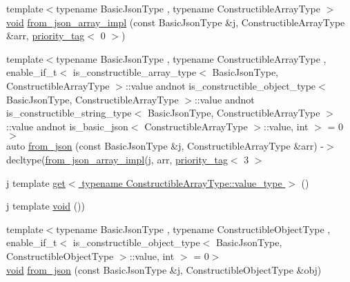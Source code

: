 \begin{DoxyCompactItemize}
{\footnotesize template$<$typename Basic\+Json\+Type , typename Constructible\+Array\+Type $>$ }\\\hyperlink{namespacenlohmann_1_1detail_a59fca69799f6b9e366710cb9043aa77d}{void} \hyperlink{namespacenlohmann_1_1detail_a20cf21255e75cff1ffb0869c2c545e63}{from\+\_\+json\+\_\+array\+\_\+impl} (const Basic\+Json\+Type \&j, Constructible\+Array\+Type \&arr, \hyperlink{structnlohmann_1_1detail_1_1priority__tag}{priority\+\_\+tag}$<$ 0 $>$)
\item 
{\footnotesize template$<$typename Basic\+Json\+Type , typename Constructible\+Array\+Type , enable\+\_\+if\+\_\+t$<$ is\+\_\+constructible\+\_\+array\+\_\+type$<$ Basic\+Json\+Type, Constructible\+Array\+Type $>$\+::value andnot is\+\_\+constructible\+\_\+object\+\_\+type$<$ Basic\+Json\+Type, Constructible\+Array\+Type $>$\+::value andnot is\+\_\+constructible\+\_\+string\+\_\+type$<$ Basic\+Json\+Type, Constructible\+Array\+Type $>$\+::value andnot is\+\_\+basic\+\_\+json$<$ Constructible\+Array\+Type $>$\+::value, int $>$  = 0$>$ }\\auto \hyperlink{namespacenlohmann_1_1detail_a14d8cdf544585f1c38eab6a0820e55f7}{from\+\_\+json} (const Basic\+Json\+Type \&j, Constructible\+Array\+Type \&arr) -\/$>$ decltype(\hyperlink{namespacenlohmann_1_1detail_a40f7bb070a60e8ba14fffb9c117fcbd8}{from\+\_\+json\+\_\+array\+\_\+impl}(j, arr, \hyperlink{structnlohmann_1_1detail_1_1priority__tag}{priority\+\_\+tag}$<$ 3 $>$
\item 
j template \hyperlink{namespacenlohmann_1_1detail_ad9e016d7b6a3cd2847027950aa0aac3b}{get$<$ typename Constructible\+Array\+Type\+::value\+\_\+type $>$} ()
\item 
j template \hyperlink{namespacenlohmann_1_1detail_a59fca69799f6b9e366710cb9043aa77d}{void} ())
\item 
{\footnotesize template$<$typename Basic\+Json\+Type , typename Constructible\+Object\+Type , enable\+\_\+if\+\_\+t$<$ is\+\_\+constructible\+\_\+object\+\_\+type$<$ Basic\+Json\+Type, Constructible\+Object\+Type $>$\+::value, int $>$  = 0$>$ }\\\hyperlink{namespacenlohmann_1_1detail_a59fca69799f6b9e366710cb9043aa77d}{void} \hyperlink{namespacenlohmann_1_1detail_a5b24896e5f5db6af06d939dde4b63fe1}{from\+\_\+json} (const Basic\+Json\+Type \&j, Constructible\+Object\+Type \&obj)
\item 

\end{DoxyCompactItemize}
